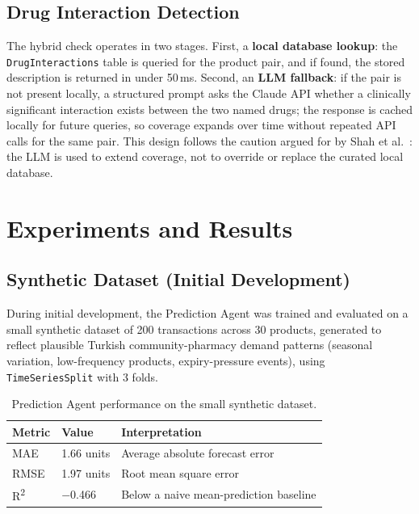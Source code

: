 \documentclass[12pt,a4paper]{article}
\begin{document}
\subsection{Drug Interaction Detection}

The hybrid check operates in two stages. First, a \textbf{local database lookup}: the \texttt{DrugInteractions} table is queried for the product pair, and if found, the stored description is returned in under 50\,ms. Second, an \textbf{LLM fallback}: if the pair is not present locally, a structured prompt asks the Claude API whether a clinically significant interaction exists between the two named drugs; the response is cached locally for future queries, so coverage expands over time without repeated API calls for the same pair. This design follows the caution argued for by Shah et al.~\cite{shah2023}: the LLM is used to extend coverage, not to override or replace the curated local database.

\section{Experiments and Results}
\label{sec:results}

\subsection{Synthetic Dataset (Initial Development)}

During initial development, the Prediction Agent was trained and evaluated on a small synthetic dataset of 200 transactions across 30 products, generated to reflect plausible Turkish community-pharmacy demand patterns (seasonal variation, low-frequency products, expiry-pressure events), using \texttt{TimeSeriesSplit} with 3 folds.

\begin{table}[H]
\centering
\caption{Prediction Agent performance on the small synthetic dataset.}
\label{tab:synthetic}
\begin{tabular}{lll}
\toprule
\textbf{Metric} & \textbf{Value} & \textbf{Interpretation} \\
\midrule
MAE & 1.66 units & Average absolute forecast error \\
RMSE & 1.97 units & Root mean square error \\
R\textsuperscript{2} & $-$0.466 & Below a naive mean-prediction baseline \\
\bottomrule
\end{tabular}
\end{table}
\end{document}
